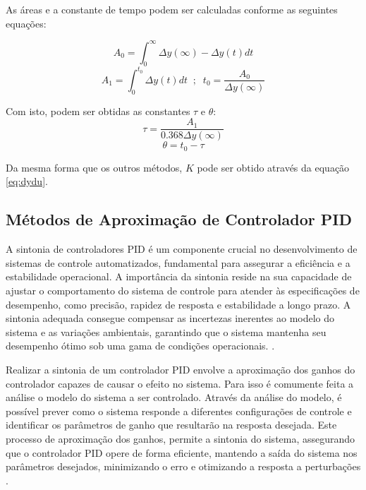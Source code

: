 As áreas e a constante de tempo podem ser calculadas conforme as seguintes equações:

\begin{equation}
    \label{eq:nia0}
    A_0 = \int_{0}^{\infty} { \Delta y(\infty) - \Delta y(t) } dt
\end{equation}
\begin{equation}
    \label{eq:nia1nt0}
    A_1 = \int_{0}^{t_0} \Delta y(t) dt \;\; ; \;\; t_0 = \frac{A_0}{\Delta y(\infty)}
\end{equation}

Com isto, podem ser obtidas as constantes $\tau$ e $\theta$:
\begin{equation}
    \label{eq:nitau}
    \tau = \frac{A_1}{0.368\Delta y(\infty)}
\end{equation}
\begin{equation}
    \label{eq:nitheta}
    \theta = t_0 - \tau
\end{equation}

Da mesma forma que os outros métodos, $K$ pode ser obtido através da equação \eqref{eq:dydu}.

\subsection{Métodos de Aproximação de Controlador PID}

A sintonia de controladores PID é um componente crucial no desenvolvimento de sistemas de controle automatizados,
fundamental para assegurar a eficiência e a estabilidade operacional.
A importância da sintonia reside na sua capacidade de ajustar o comportamento do sistema de controle para atender às
especificações de desempenho, como precisão, rapidez de resposta e estabilidade a longo prazo.
A sintonia adequada consegue compensar as incertezas inerentes ao modelo do sistema e as variações ambientais,
garantindo que o sistema mantenha seu desempenho ótimo sob uma gama de condições operacionais.
\cite{apostpidsint}.

Realizar a sintonia de um controlador PID envolve a aproximação dos ganhos do controlador capazes de causar o efeito no
sistema.
Para isso é comumente feita a análise o modelo do sistema a ser controlado.
Através da análise do modelo, é possível prever como o sistema responde a diferentes configurações de controle e
identificar os parâmetros de ganho que resultarão na resposta desejada.
Este processo de aproximação dos ganhos, permite a sintonia do sistema, assegurando que o controlador PID opere de forma
eficiente, mantendo a saída do sistema nos parâmetros desejados, minimizando o erro e otimizando a resposta a
perturbações \cite{apostpidsint}.

